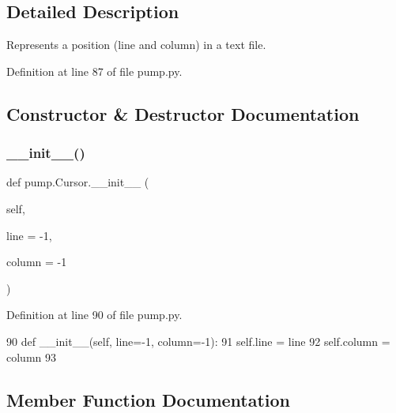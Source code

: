 \subsection{Detailed Description}
\begin{DoxyVerb}Represents a position (line and column) in a text file.\end{DoxyVerb}
 

Definition at line 87 of file pump.\+py.



\subsection{Constructor \& Destructor Documentation}
\mbox{\label{classpump_1_1Cursor_a17126ae70ca573c43e4d38b1ccd03015}} 
\subsubsection{\texorpdfstring{\+\_\+\+\_\+init\+\_\+\+\_\+()}{\_\_init\_\_()}}
{\footnotesize\ttfamily def pump.\+Cursor.\+\_\+\+\_\+init\+\_\+\+\_\+ (\begin{DoxyParamCaption}\item[{}]{self,  }\item[{}]{line = {\ttfamily -\/1},  }\item[{}]{column = {\ttfamily -\/1} }\end{DoxyParamCaption})}



Definition at line 90 of file pump.\+py.


\begin{DoxyCode}
90   \textcolor{keyword}{def }\_\_init\_\_(self, line=-1, column=-1):
91     self.line = line
92     self.column = column
93 
\end{DoxyCode}


\subsection{Member Function Documentation}
\mbox{\label{classpump_1_1Cursor_a75b9a3cf0d49413437c8d4fc0d1d5ff3}} 
